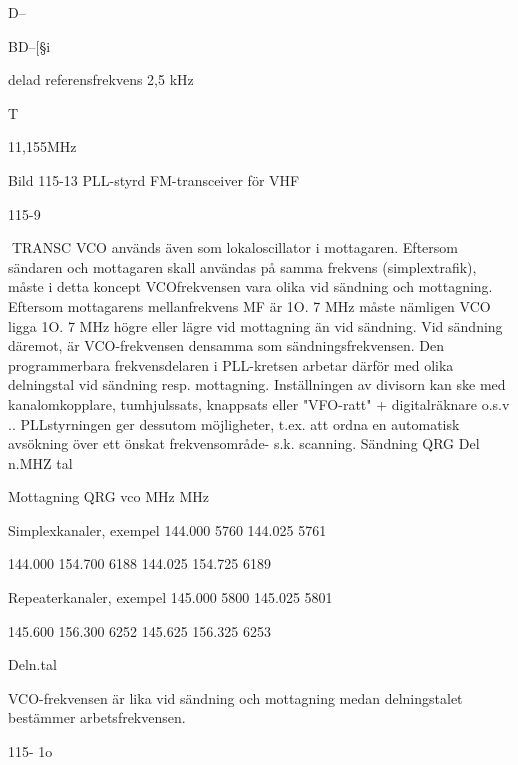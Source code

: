 D--{BD--[§i~

delad
referensfrekvens 2,5 kHz

T

11,155MHz

Bild 115-13 PLL-styrd FM-transceiver för VHF

115-9

TRANSC
VCO används även som lokaloscillator i
mottagaren. Eftersom sändaren och mottagaren skall användas på samma frekvens
(simplextrafik), måste i detta koncept VCOfrekvensen vara olika vid sändning och mottagning. Eftersom mottagarens mellanfrekvens MF är 1O. 7 MHz måste nämligen VCO
ligga 1O. 7 MHz högre eller lägre vid mottagning än vid sändning. Vid sändning däremot, är VCO-frekvensen densamma som
sändningsfrekvensen.
Den programmerbara frekvensdelaren i
PLL-kretsen arbetar därför med olika delningstal vid sändning resp. mottagning. Inställningen av divisorn kan ske med kanalomkopplare, tumhjulssats, knappsats eller
"VFO-ratt" + digitalräknare o.s.v .. PLLstyrningen ger dessutom möjligheter, t.ex.
att ordna en automatisk avsökning över ett
önskat frekvensområde- s.k. scanning.
Sändning
QRG
Del n.MHZ
tal

Mottagning
QRG
vco
MHz
MHz

Simplexkanaler,
exempel
144.000 5760
144.025 5761

144.000 154.700 6188
144.025 154.725 6189

Repeaterkanaler,
exempel
145.000 5800
145.025 5801

145.600 156.300 6252
145.625 156.325 6253

Deln.tal

VCO-frekvensen är lika vid sändning och
mottagning medan delningstalet bestämmer
arbetsfrekvensen.

115- 1o

}
